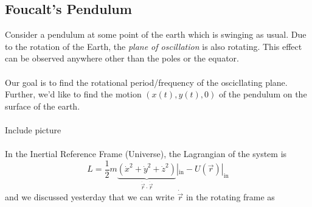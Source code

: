 \documentclass[11pt]{article}
\begin{document}
\subsection{Foucalt's Pendulum}
Consider a pendulum at some point of the earth which is swinging as usual. Due to the rotation of the Earth, the \emph{plane of oscillation} is also rotating. This effect can be observed anywhere other than the poles or the equator.
\\
\\
Our goal is to find the rotational period/frequency of the oscicllating plane. Further, we'd like to find the motion $\left(x(t), y(t), 0\right)$ of the pendulum on the surface of the earth.
\\
\\
Include picture
\\
\\
In the Inertial Reference Frame (Universe), the Lagrangian of the system is 
\[ L = \frac{1}{2}m \underbrace{\left(\dot{x}^2 + \dot{y}^2 + \dot{z}^2\right)}_{\dot{\vec{r}} \cdot \dot{\vec{r}} }|_{\text{in}} - U(\vec{r})|_{\text{in}}  \]
and we discussed yesterday that we can write $\dot{\vec{r}}$ in the rotating frame as 
\end{document}
